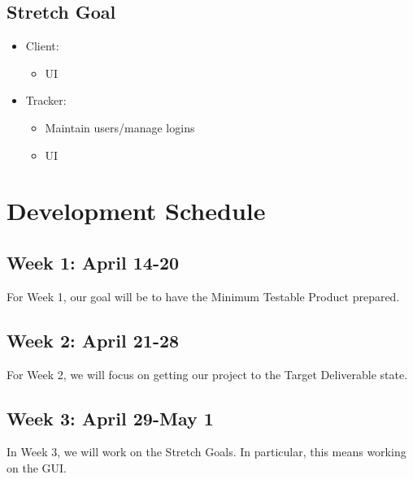 \documentclass[12pt]{article}
\begin{document}
\subsection*{Stretch Goal}
\begin{itemize}
\item  Client:
    \begin{itemize}
    \item  UI
    \end{itemize}
\item  Tracker:
    \begin{itemize}
    \item  Maintain users/manage logins
    \item  UI
    \end{itemize}
\end{itemize}

\section*{Development Schedule}

\subsection*{Week 1: April 14-20}
For Week 1, our goal will be to have the Minimum Testable Product prepared.

\subsection*{Week 2: April 21-28}
For Week 2, we will focus on getting our project to the Target Deliverable state.

\subsection*{Week 3: April 29-May 1}
In Week 3, we will work on the Stretch Goals.
In particular, this means working on the GUI.
\end{document}
